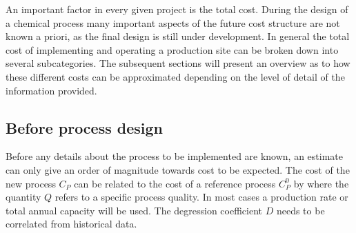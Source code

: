     An important factor in every given project is the total cost. During the design of a chemical process many
    important aspects of the future cost structure are not known a priori, as the final design is still under development.
    In general the total cost of implementing and operating a production site can be broken down into
    several subcategories.
    The subsequent sections will present an overview as to how these different costs can be approximated
    depending on the level of detail of the information provided.

        \subsection{Before process design}
        \label{sec:before}
        Before any details about the process to be implemented are known, an estimate can only give an
        order of magnitude towards cost to be expected. The cost of the new process $C_P$ can be
        related to the cost of a reference process $C_{P}^0$ by
        where the quantity $Q$ refers to a specific process quality. In most cases a production rate or total
        annual capacity will be used. The degression coefficient $D$ needs to be correlated from historical data.

